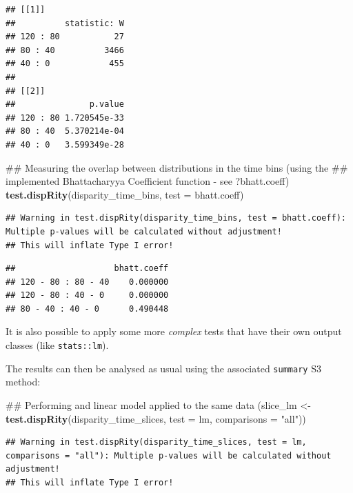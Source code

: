 \documentclass[]{book}
\newenvironment{Shaded}{\begin{snugshade}}{\end{snugshade}}
\newcommand{\KeywordTok}[1]{\textcolor[rgb]{0.13,0.29,0.53}{\textbf{#1}}}
\newcommand{\DataTypeTok}[1]{\textcolor[rgb]{0.13,0.29,0.53}{#1}}
\newcommand{\StringTok}[1]{\textcolor[rgb]{0.31,0.60,0.02}{#1}}
\newcommand{\NormalTok}[1]{#1}
\theoremstyle{definition}
\theoremstyle{definition}
\theoremstyle{remark}
\begin{document}
\begin{verbatim}
## [[1]]
##          statistic: W
## 120 : 80           27
## 80 : 40          3466
## 40 : 0            455
## 
## [[2]]
##               p.value
## 120 : 80 1.720545e-33
## 80 : 40  5.370214e-04
## 40 : 0   3.599349e-28
\end{verbatim}

\begin{Shaded}
\begin{Highlighting}[]
\NormalTok{## Measuring the overlap between distributions in the time bins (using the}
\NormalTok{## implemented Bhattacharyya Coefficient function - see ?bhatt.coeff)}
\KeywordTok{test.dispRity}\NormalTok{(disparity_time_bins, }\DataTypeTok{test =}\NormalTok{ bhatt.coeff)}
\end{Highlighting}
\end{Shaded}

\begin{verbatim}
## Warning in test.dispRity(disparity_time_bins, test = bhatt.coeff): Multiple p-values will be calculated without adjustment!
## This will inflate Type I error!
\end{verbatim}

\begin{verbatim}
##                    bhatt.coeff
## 120 - 80 : 80 - 40    0.000000
## 120 - 80 : 40 - 0     0.000000
## 80 - 40 : 40 - 0      0.490448
\end{verbatim}

It is also possible to apply some more \emph{complex} tests that have
their own output classes (like \texttt{stats::lm}).

The results can then be analysed as usual using the associated
\texttt{summary} S3 method:

\begin{Shaded}
\begin{Highlighting}[]
\NormalTok{## Performing and linear model applied to the same data}
\NormalTok{(slice_lm <-}\StringTok{ }\KeywordTok{test.dispRity}\NormalTok{(disparity_time_slices, }\DataTypeTok{test =}\NormalTok{ lm,}
                            \DataTypeTok{comparisons =} \StringTok{"all"}\NormalTok{))}
\end{Highlighting}
\end{Shaded}

\begin{verbatim}
## Warning in test.dispRity(disparity_time_slices, test = lm, comparisons = "all"): Multiple p-values will be calculated without adjustment!
## This will inflate Type I error!
\end{verbatim}
\end{document}
